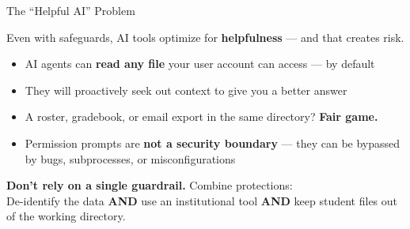 \documentclass[aspectratio=169, 10pt]{beamer}
\begin{document}
\begin{frame}{The ``Helpful AI'' Problem}

Even with safeguards, AI tools optimize for \textbf{helpfulness} --- and that creates risk.

\vspace{0.2cm}

\begin{tcolorbox}[keybox, title={\faExclamationTriangle\quad Why Defense in Depth Matters}]
\begin{itemize}\small
  \item AI agents can \textbf{read any file} your user account can access --- by default
  \item They will proactively seek out context to give you a better answer
  \item A roster, gradebook, or email export in the same directory? \textbf{Fair game.}
  \item Permission prompts are \textbf{not a security boundary} --- they can be bypassed by bugs, subprocesses, or misconfigurations
\end{itemize}
\end{tcolorbox}

\vspace{0.2cm}

\begin{tcolorbox}[accentbox]
\centering
\small\textbf{Don't rely on a single guardrail.} Combine protections:\\[3pt]
\footnotesize De-identify the data \textbf{AND} use an institutional tool \textbf{AND} keep student files out of the working directory.
\end{tcolorbox}

\end{frame}
\end{document}
